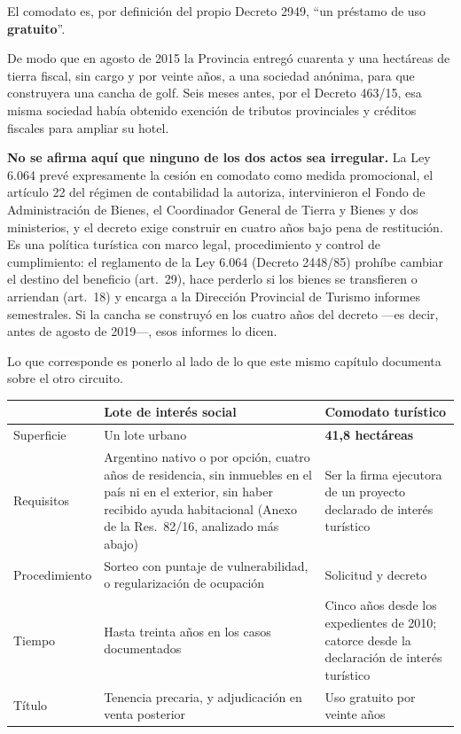 \begin{cautela}
El comodato es, por definición del propio Decreto 2949, ``un préstamo de uso \textbf{gratuito}''.

De modo que en agosto de 2015 la Provincia entregó cuarenta y una hectáreas de tierra fiscal, sin cargo y por veinte años, a una sociedad anónima, para que construyera una cancha de golf. Seis meses antes, por el Decreto 463/15, esa misma sociedad había obtenido exención de tributos provinciales y créditos fiscales para ampliar su hotel.

\textbf{No se afirma aquí que ninguno de los dos actos sea irregular.} La Ley 6.064 prevé expresamente la cesión en comodato como medida promocional, el artículo 22 del régimen de contabilidad la autoriza, intervinieron el Fondo de Administración de Bienes, el Coordinador General de Tierra y Bienes y dos ministerios, y el decreto exige construir en cuatro años bajo pena de restitución. Es una política turística con marco legal, procedimiento y control de cumplimiento: el reglamento de la Ley 6.064 (Decreto 2448/85) prohíbe cambiar el destino del beneficio (art.\ 29), hace perderlo si los bienes se transfieren o arriendan (art.\ 18) y encarga a la Dirección Provincial de Turismo informes semestrales. Si la cancha se construyó en los cuatro años del decreto ---es decir, antes de agosto de 2019---, esos informes lo dicen.

Lo que corresponde es ponerlo al lado de lo que este mismo capítulo documenta sobre el otro circuito.

\begin{center}\small
\begin{tabular}{@{}p{4.0cm}p{4.0cm}p{4.0cm}@{}}
\toprule
 & \textbf{Lote de interés social} & \textbf{Comodato turístico} \\
\midrule
Superficie & Un lote urbano & \textbf{41,8 hectáreas} \\
Requisitos & Argentino nativo o por opción, cuatro años de residencia, sin inmuebles en el país ni en el exterior, sin haber recibido ayuda habitacional (Anexo de la Res.\ 82/16, analizado más abajo) & Ser la firma ejecutora de un proyecto declarado de interés turístico \\
Procedimiento & Sorteo con puntaje de vulnerabilidad, o regularización de ocupación & Solicitud y decreto \\
Tiempo & Hasta treinta años en los casos documentados & Cinco años desde los expedientes de 2010; catorce desde la declaración de interés turístico \\
Título & Tenencia precaria, y adjudicación en venta posterior & Uso gratuito por veinte años \\
\bottomrule
\end{tabular}
\end{center}


\end{cautela}
